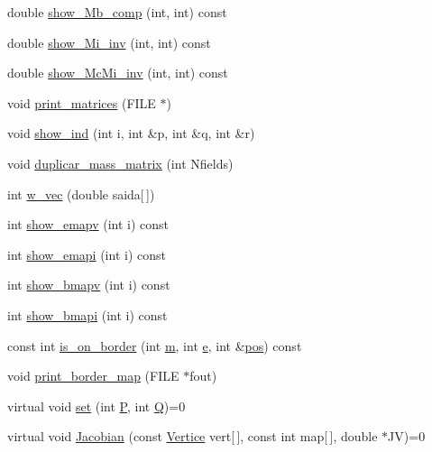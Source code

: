 \begin{DoxyCompactItemize}
\item 
double \hyperlink{classStdel_a4860f0f650640f859c5f75c206ee1f60}{show\+\_\+\+Mb\+\_\+comp} (int, int) const
\item 
double \hyperlink{classStdel_a11bf2897170ada9a9dd8f641a39585e5}{show\+\_\+\+Mi\+\_\+inv} (int, int) const
\item 
double \hyperlink{classStdel_a44d5aa234e02fb41afd5a4e5e45fadc4}{show\+\_\+\+Mc\+Mi\+\_\+inv} (int, int) const
\item 
void \hyperlink{classStdel_a319e6a16011b22e12028a841b7686f03}{print\+\_\+matrices} (F\+I\+LE $\ast$)
\item 
void \hyperlink{classStdel_a20afd536025caf1aad1c4e3f41fcb866}{show\+\_\+ind} (int i, int \&p, int \&q, int \&r)
\item 
void \hyperlink{classStdel_a922b779be1f8f12b7a5535ab529bff64}{duplicar\+\_\+mass\+\_\+matrix} (int Nfields)
\item 
int \hyperlink{classStdel_a395c8d7d7890a9efdea23932fa22b420}{w\+\_\+vec} (double saida\mbox{[}$\,$\mbox{]})
\item 
int \hyperlink{classStdel_ad474ffc52b051ae8317b3fdb583c4c98}{show\+\_\+emapv} (int i) const
\item 
int \hyperlink{classStdel_aca7fb885191a952c013e930521a42213}{show\+\_\+emapi} (int i) const
\item 
int \hyperlink{classStdel_ac8787dabfb1d767b89e39806522c1161}{show\+\_\+bmapv} (int i) const
\item 
int \hyperlink{classStdel_ad3a0646ad7ec2567e46da36285dee331}{show\+\_\+bmapi} (int i) const
\item 
const int \hyperlink{classStdel_abb022f0ad81707e11e3a3091d2d87c46}{is\+\_\+on\+\_\+border} (int \hyperlink{DG__EI__Header_8h_a742204794ea328ba293fe59cec79b990}{m}, int \hyperlink{DG__EI__Header_8h_ab1ff01ebd410ddf016a3c7bbe9d98944}{e}, int \&\hyperlink{DG__EI__Header_8h_a1910d262855b71da353ed0d07a6c7823}{pos}) const
\item 
void \hyperlink{classStdel_a9a0c69dca7564f6ca4aa4f3c9864ea01}{print\+\_\+border\+\_\+map} (F\+I\+LE $\ast$fout)
\item 
virtual void \hyperlink{classStdel_ab42c46493ab17be6f2642a558fea8a05}{set} (int \hyperlink{classStdel_a05cbb3f2a3fa0bc04a74e347dc6574cf}{P}, int \hyperlink{classStdel_a82074e598ad5af5ec45a3257a3c2b684}{Q})=0
\item 
virtual void \hyperlink{classStdel_a953ff994c1bb423245aff079932c648f}{Jacobian} (const \hyperlink{structVertice}{Vertice} vert\mbox{[}$\,$\mbox{]}, const int map\mbox{[}$\,$\mbox{]}, double $\ast$JV)=0

\end{DoxyCompactItemize}
